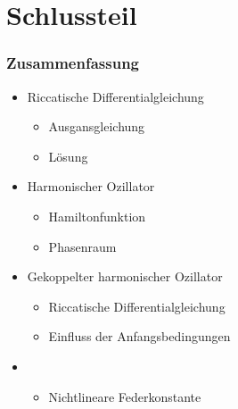 \documentclass[ngerman, aspectratio=169, xcolor={rgb}]{beamer}
\begin{document}
\section{Schlussteil}
\begin{frame}
	\frametitle{Zusammenfassung}
	\begin{itemize}
		\pause
		\item{Riccatische Differentialgleichung}
		      \pause
		      \begin{itemize}
			      \item{Ausgansgleichung}
			            \pause
			      \item{Lösung}
		      \end{itemize}
		      \pause
		\item{Harmonischer Ozillator}
		      \pause
		      \begin{itemize}
			      \item{Hamiltonfunktion}
			            \pause
			      \item{Phasenraum}
		      \end{itemize}
		      \pause
		\item{Gekoppelter harmonischer Ozillator}
		      \pause
		      \begin{itemize}
			      \item{Riccatische Differentialgleichung}
			            \pause
			      \item{Einfluss der Anfangsbedingungen}
		      \end{itemize}
		      \pause
		\item{}
		      \begin{itemize}
			      \pause
			      \item{Nichtlineare Federkonstante}
		      \end{itemize}

	\end{itemize}
\end{frame}
\end{document}
